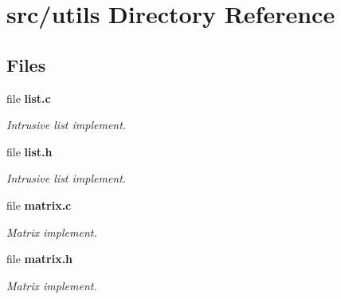 \section{src/utils Directory Reference}
\label{dir_313caf1132e152dd9b58bea13a4052ca}
\subsection*{Files}
\begin{DoxyCompactItemize}
\item 
file \textbf{ list.\+c}
\begin{DoxyCompactList}\small\item\em Intrusive list implement. \end{DoxyCompactList}\item 
file \textbf{ list.\+h}
\begin{DoxyCompactList}\small\item\em Intrusive list implement. \end{DoxyCompactList}\item 
file \textbf{ matrix.\+c}
\begin{DoxyCompactList}\small\item\em Matrix implement. \end{DoxyCompactList}\item 
file \textbf{ matrix.\+h}
\begin{DoxyCompactList}\small\item\em Matrix implement. \end{DoxyCompactList}\end{DoxyCompactItemize}

